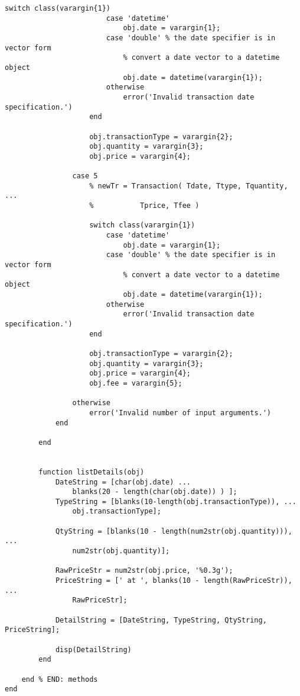\begin{lstlisting}[style=Matlab-editor]
                    switch class(varargin{1})
                        case 'datetime'
                            obj.date = varargin{1};
                        case 'double' % the date specifier is in vector form
                            % convert a date vector to a datetime object
                            obj.date = datetime(varargin{1});
                        otherwise
                            error('Invalid transaction date specification.')
                    end
                    
                    obj.transactionType = varargin{2};
                    obj.quantity = varargin{3};
                    obj.price = varargin{4};
                    
                case 5
                    % newTr = Transaction( Tdate, Ttype, Tquantity, ...
                    %           Tprice, Tfee )
                    
                    switch class(varargin{1})
                        case 'datetime'
                            obj.date = varargin{1};
                        case 'double' % the date specifier is in vector form
                            % convert a date vector to a datetime object
                            obj.date = datetime(varargin{1});
                        otherwise
                            error('Invalid transaction date specification.')
                    end
                    
                    obj.transactionType = varargin{2};
                    obj.quantity = varargin{3};
                    obj.price = varargin{4};
                    obj.fee = varargin{5};
                    
                otherwise
                    error('Invalid number of input arguments.')
            end
            
        end
        
        
        function listDetails(obj)
            DateString = [char(obj.date) ...
                blanks(20 - length(char(obj.date)) ) ];
            TypeString = [blanks(10-length(obj.transactionType)), ...
                obj.transactionType];
            
            QtyString = [blanks(10 - length(num2str(obj.quantity))), ...
                num2str(obj.quantity)];
            
            RawPriceStr = num2str(obj.price, '%0.3g');
            PriceString = [' at ', blanks(10 - length(RawPriceStr)), ...
                RawPriceStr];
            
            DetailString = [DateString, TypeString, QtyString, PriceString];
            
            disp(DetailString)
        end
        
    end % END: methods
end
\end{lstlisting}

